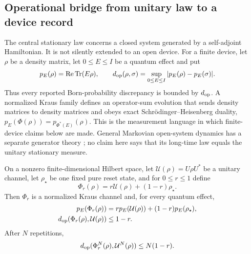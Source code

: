 \subsection{Operational bridge from unitary law to a device record}

The central stationary law concerns a closed system generated by a
self-adjoint Hamiltonian.  It is not silently extended to an open device.
For a finite device, let $\rho$ be a density matrix, let $0\le E\le I$ be a
quantum effect and put
\begin{equation}
 p_E(\rho)=\operatorname{Re}\operatorname{Tr}(E\rho),\qquad
 d_{\rm op}(\rho,\sigma)=
 \sup_{0\le E\le I}|p_E(\rho)-p_E(\sigma)|.          \label{eq:operational-distance}
\end{equation}
Thus every reported Born-probability discrepancy is bounded by
$d_{\rm op}$.  A normalized Kraus family defines an operator-sum evolution
that sends density matrices to density matrices and obeys exact
Schr\"odinger--Heisenberg duality,
$p_E(\Phi(\rho))=p_{\Phi^*(E)}(\rho)$.  This is the measurement language in
which finite-device claims below are made.  General Markovian open-system
dynamics has a separate generator theory
\cite{GoriniKossakowskiSudarshan1976,Lindblad1976}; no claim here says that
its long-time law equals the unitary stationary measure.

\begin{proposition}
\label{prop:reset-noise}
On a nonzero finite-dimensional Hilbert space, let
$\mathcal U(\rho)=U\rho U^*$ be a unitary channel, let
$\rho_\star$ be one fixed pure reset state, and for $0\le r\le1$ define
\begin{equation}
 \Phi_r(\rho)=r\mathcal U(\rho)+(1-r)\rho_\star .    \label{eq:reset-channel}
\end{equation}
Then $\Phi_r$ is a normalized Kraus channel and, for every quantum effect,
\begin{align}
 p_E(\Phi_r(\rho))
 &=r p_E(\mathcal U(\rho))+(1-r)p_E(\rho_\star),    \label{eq:reset-born}\\
 d_{\rm op}(\Phi_r(\rho),\mathcal U(\rho))
 &\le1-r.                                           \label{eq:reset-onestep}
\end{align}
After $N$ repetitions,
\begin{equation}
 d_{\rm op}(\Phi_r^N(\rho),\mathcal U^N(\rho))
 \le N(1-r).                                        \label{eq:reset-iterate}
\end{equation}
\end{proposition}

